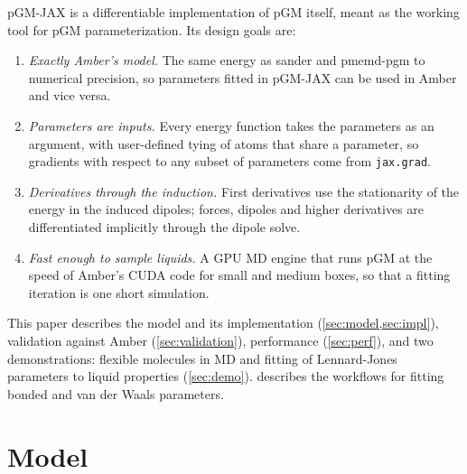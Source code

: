 \documentclass[11pt]{article}
\newcommand{\code}[1]{\texttt{#1}}
\begin{document}
pGM-JAX is a differentiable implementation of pGM itself, meant as the working tool for pGM
parameterization. Its design goals are:
\begin{enumerate}[nosep]
\item \emph{Exactly Amber's model.} The same energy as sander and pmemd-pgm to numerical
precision, so parameters fitted in pGM-JAX can be used in Amber and vice versa.
\item \emph{Parameters are inputs.} Every energy function takes the parameters as an argument,
with user-defined tying of atoms that share a parameter, so gradients with respect to any subset
of parameters come from \code{jax.grad}.
\item \emph{Derivatives through the induction.} First derivatives use the stationarity of the
energy in the induced dipoles; forces, dipoles and higher derivatives are differentiated
implicitly through the dipole solve.
\item \emph{Fast enough to sample liquids.} A GPU MD engine that runs pGM at the speed of Amber's
CUDA code for small and medium boxes, so that a fitting iteration is one short simulation.
\end{enumerate}
This paper describes the model and its implementation (\cref{sec:model,sec:impl}), validation
against Amber (\cref{sec:validation}), performance (\cref{sec:perf}), and two demonstrations:
flexible molecules in MD and fitting of Lennard-Jones parameters to liquid properties
(\cref{sec:demo}).  describes the workflows for fitting bonded and van der
Waals parameters.

\section{Model}\label{sec:model}
\end{document}
